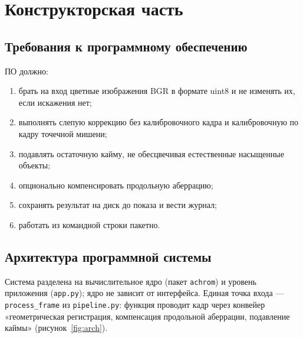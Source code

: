 \documentclass[a4paper,14pt,oneside]{extreport}
\begin{document}
\section{Конструкторская часть}

\subsection{Требования к программному обеспечению}

ПО должно:
\begin{enumerate}
\item брать на вход цветные изображения BGR в формате uint8 и не изменять их, если искажения нет;
\item выполнять слепую коррекцию без калибровочного кадра и калибровочную по
кадру точечной мишени;
\item подавлять остаточную кайму, не обесцвечивая естественные насыщенные
объекты;
\item опционально компенсировать продольную аберрацию;
\item сохранять результат на диск до показа и вести журнал;
\item работать из командной строки пакетно.
\end{enumerate}

\subsection{Архитектура программной системы}

Система разделена на вычислительное ядро (пакет \texttt{achrom}) и уровень
приложения (\texttt{app.py}); ядро не зависит от интерфейса. Единая точка
входа --- \texttt{process\_frame} из \texttt{pipeline.py}: функция проводит
кадр через конвейер «геометрическая регистрация, компенсация продольной аберрации,
подавление каймы» (рисунок~\ref{fig:arch}).
\end{document}
